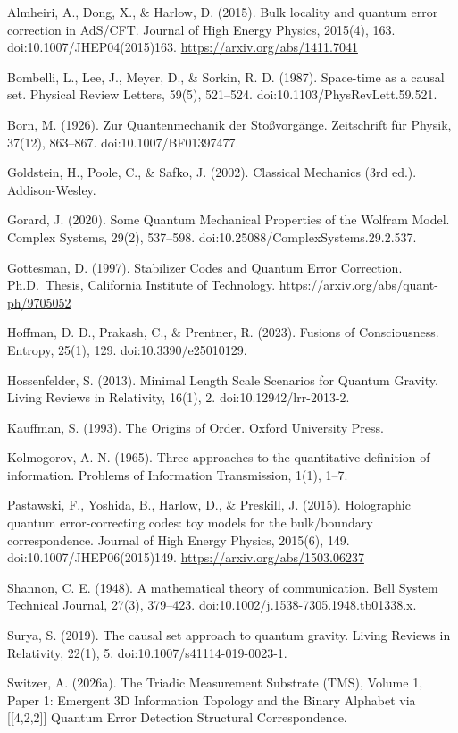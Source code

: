 \documentclass[11pt,oneside]{report}
\theoremstyle{definition}
\theoremstyle{remark}
\newenvironment{reflist}
  {\par\small\setlength{\parindent}{0pt}%
   \setlength{\leftskip}{1.6em}\setlength{\parindent}{-1.6em}%
   \setlength{\parskip}{0.4em}%
   \raggedright\hyphenpenalty=50\exhyphenpenalty=50\relax
   \sloppy}
  {\par}
\begin{document}
\begin{reflist}
Almheiri, A., Dong, X., \& Harlow, D. (2015). Bulk locality and quantum
error correction in AdS/CFT. Journal of High Energy Physics, 2015(4),
163. doi:10.1007/JHEP04(2015)163. \url{https://arxiv.org/abs/1411.7041}

Bombelli, L., Lee, J., Meyer, D., \& Sorkin, R. D. (1987). Space-time as
a causal set. Physical Review Letters, 59(5), 521--524.
doi:10.1103/PhysRevLett.59.521.

Born, M. (1926). Zur Quantenmechanik der Stoßvorgänge. Zeitschrift für
Physik, 37(12), 863--867. doi:10.1007/BF01397477.

Goldstein, H., Poole, C., \& Safko, J. (2002). Classical Mechanics (3rd
ed.). Addison-Wesley.

Gorard, J. (2020). Some Quantum Mechanical Properties of the Wolfram
Model. Complex Systems, 29(2), 537--598.
doi:10.25088/ComplexSystems.29.2.537.

Gottesman, D. (1997). Stabilizer Codes and Quantum Error Correction.
Ph.D.~Thesis, California Institute of Technology.
\url{https://arxiv.org/abs/quant-ph/9705052}

Hoffman, D. D., Prakash, C., \& Prentner, R. (2023). Fusions of
Consciousness. Entropy, 25(1), 129. doi:10.3390/e25010129.

Hossenfelder, S. (2013). Minimal Length Scale Scenarios for Quantum
Gravity. Living Reviews in Relativity, 16(1), 2.
doi:10.12942/lrr-2013-2.

Kauffman, S. (1993). The Origins of Order. Oxford University Press.

Kolmogorov, A. N. (1965). Three approaches to the quantitative
definition of information. Problems of Information Transmission, 1(1),
1--7.

Pastawski, F., Yoshida, B., Harlow, D., \& Preskill, J. (2015).
Holographic quantum error-correcting codes: toy models for the
bulk/boundary correspondence. Journal of High Energy Physics, 2015(6),
149. doi:10.1007/JHEP06(2015)149. \url{https://arxiv.org/abs/1503.06237}

Shannon, C. E. (1948). A mathematical theory of communication. Bell
System Technical Journal, 27(3), 379--423.
doi:10.1002/j.1538-7305.1948.tb01338.x.

Surya, S. (2019). The causal set approach to quantum gravity. Living
Reviews in Relativity, 22(1), 5. doi:10.1007/s41114-019-0023-1.

Switzer, A. (2026a). The Triadic Measurement Substrate (TMS), Volume 1,
Paper 1: Emergent 3D Information Topology and the Binary Alphabet via
[[4,2,2]] Quantum Error Detection Structural Correspondence.


\end{reflist}
\end{document}
